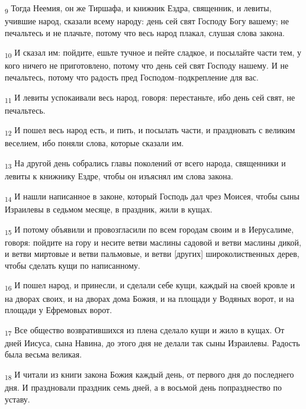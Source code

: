 \begin{tcolorbox}
\textsubscript{9} Тогда Неемия, он же Тиршафа, и книжник Ездра, священник, и левиты, учившие народ, сказали всему народу: день сей свят Господу Богу вашему; не печальтесь и не плачьте, потому что весь народ плакал, слушая слова закона.
\end{tcolorbox}
\begin{tcolorbox}
\textsubscript{10} И сказал им: пойдите, ешьте тучное и пейте сладкое, и посылайте части тем, у кого ничего не приготовлено, потому что день сей свят Господу нашему. И не печальтесь, потому что радость пред Господом--подкрепление для вас.
\end{tcolorbox}
\begin{tcolorbox}
\textsubscript{11} И левиты успокаивали весь народ, говоря: перестаньте, ибо день сей свят, не печальтесь.
\end{tcolorbox}
\begin{tcolorbox}
\textsubscript{12} И пошел весь народ есть, и пить, и посылать части, и праздновать с великим веселием, ибо поняли слова, которые сказали им.
\end{tcolorbox}
\begin{tcolorbox}
\textsubscript{13} На другой день собрались главы поколений от всего народа, священники и левиты к книжнику Ездре, чтобы он изъяснял им слова закона.
\end{tcolorbox}
\begin{tcolorbox}
\textsubscript{14} И нашли написанное в законе, который Господь дал чрез Моисея, чтобы сыны Израилевы в седьмом месяце, в праздник, жили в кущах.
\end{tcolorbox}
\begin{tcolorbox}
\textsubscript{15} И потому объявили и провозгласили по всем городам своим и в Иерусалиме, говоря: пойдите на гору и несите ветви маслины садовой и ветви маслины дикой, и ветви миртовые и ветви пальмовые, и ветви [других] широколиственных дерев, чтобы сделать кущи по написанному.
\end{tcolorbox}
\begin{tcolorbox}
\textsubscript{16} И пошел народ, и принесли, и сделали себе кущи, каждый на своей кровле и на дворах своих, и на дворах дома Божия, и на площади у Водяных ворот, и на площади у Ефремовых ворот.
\end{tcolorbox}
\begin{tcolorbox}
\textsubscript{17} Все общество возвратившихся из плена сделало кущи и жило в кущах. От дней Иисуса, сына Навина, до этого дня не делали так сыны Израилевы. Радость была весьма великая.
\end{tcolorbox}
\begin{tcolorbox}
\textsubscript{18} И читали из книги закона Божия каждый день, от первого дня до последнего дня. И праздновали праздник семь дней, а в восьмой день попразднество по уставу.
\end{tcolorbox}
